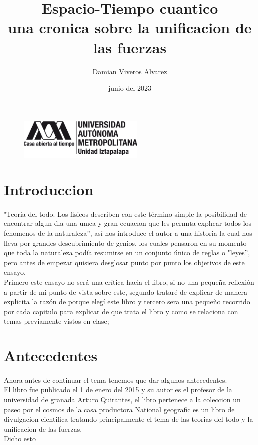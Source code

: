 \documentclass[12pt]{article}
\title{\textsf{Espacio-Tiempo cuantico\\
una cronica sobre la unificacion de las fuerzas}}
\date{junio del 2023}
\author{Damian Viveros Alvarez}
\begin{document}
\begin{figure}
    \includegraphics[width=60mm]{uam.png}
    \raggedleft  
\end{figure}
\maketitle{}
\section*{Introduccion}
\paragraph*{}
\textsf{"Teoria del todo. Los fisicos describen con este término simple la posibilidad de encontrar algun dia una unica y gran ecuacion 
que les permita explicar todos los fenomenos de la naturaleza'', así nos introduce el autor a una historia la cual nos lleva por grandes 
descubrimiento de genios, los cuales pensaron en su momento que toda la naturaleza podía resumirse en un conjunto único de reglas o "leyes'',
pero antes de empezar quisiera desglosar punto por punto los objetivos de este ensayo.\\ Primero este ensayo no será una crítica
hacia el libro, si no una pequeña reflexión a partir de mi punto de vista sobre este, segundo trataré de explicar de manera
explicita la razón de porque elegí este libro y tercero sera una pequeño recorrido por cada capitulo para explicar de que trata
el libro y como se relaciona con temas previamente vistos en clase;}
\section*{Antecedentes}
\paragraph*{}
\textsf{Ahora antes de continuar el tema tenemos que dar algunos antecedentes.\\ El libro fue publicado el 1 de enero del 2015
y su autor es el profesor de la universidad de granada Arturo Quirantes, el libro pertenece a la coleccion
un paseo por el cosmos de la casa productora National geografic es un libro de divulgacion cientifica tratando principalmente
el tema de las teorias del todo y la unificacion de las fuerzas.\\
Dicho esto}
\end{document}
